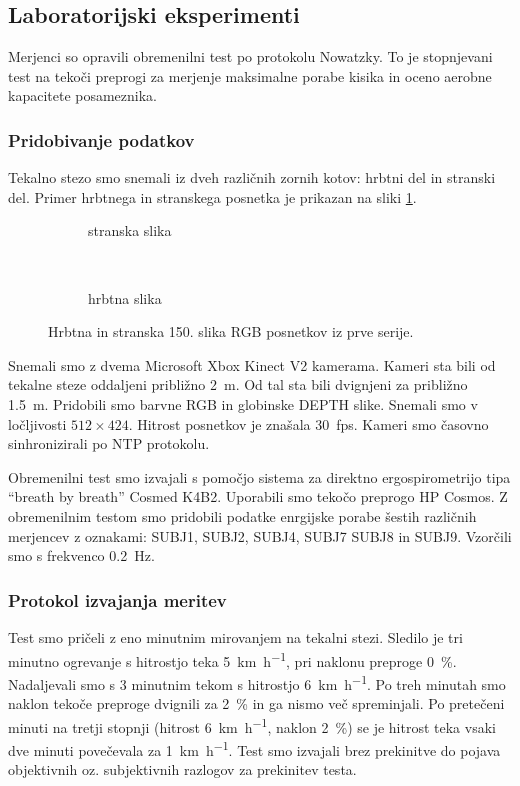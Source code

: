 \subsection{Laboratorijski eksperimenti}
Merjenci so opravili obremenilni test po protokolu Nowatzky. To je stopnjevani test na tekoči preprogi za merjenje maksimalne porabe kisika in oceno aerobne kapacitete posameznika.

\subsubsection{Pridobivanje podatkov}
Tekalno stezo smo snemali iz dveh različnih zornih kotov: hrbtni del in stranski del.  Primer hrbtnega in stranskega posnetka je prikazan na sliki \ref{fig:primer-posnetka-stage2}.

\begin{figure}[htb]
	\centering
	\begin{subfigure}{0.45\columnwidth}
		\caption{stranska slika}
	\end{subfigure}
	~
	\begin{subfigure}{0.45\columnwidth}
		\caption{hrbtna slika}
	\end{subfigure}
	\caption{Hrbtna in stranska 150. slika RGB posnetkov iz prve serije.}
	\label{fig:primer-posnetka-stage2}
\end{figure}

Snemali smo z dvema Microsoft Xbox Kinect V2 kamerama. Kameri sta bili od tekalne steze oddaljeni približno \SI{2}{m}. Od tal sta bili dvignjeni za približno \SI{1.5}{m}. Pridobili smo barvne RGB in globinske DEPTH slike. Snemali smo v ločljivosti $512 \times 424$. Hitrost posnetkov je znašala \SI{30}{fps}. Kameri smo časovno sinhronizirali po NTP protokolu.

Obremenilni test smo izvajali s pomočjo sistema za direktno ergospirometrijo tipa ``breath  by breath'' Cosmed K4B2. Uporabili smo  tekočo  preprogo HP Cosmos. Z obremenilnim testom smo pridobili podatke enrgijske porabe šestih različnih merjencev z oznakami: SUBJ1, SUBJ2, SUBJ4, SUBJ7 SUBJ8 in SUBJ9. Vzorčili smo s frekvenco \SI{0.2}{\hertz}.

\subsubsection{Protokol izvajanja meritev}
Test smo pričeli z eno minutnim mirovanjem na tekalni stezi. Sledilo je tri minutno ogrevanje s hitrostjo teka \SI{5}{\km\per\hour}, pri naklonu preproge \SI{0}{\%}. Nadaljevali smo s 3 minutnim tekom s hitrostjo \SI{6}{\km\per\hour}. Po treh minutah smo naklon tekoče preproge  dvignili za \SI{2}{\%} in ga nismo več spreminjali. Po pretečeni minuti na  tretji stopnji (hitrost \SI{6}{\km\per\hour}, naklon \SI{2}{\%}) se je hitrost teka vsaki dve  minuti  povečevala za \SI{1}{\km\per\hour}. Test smo izvajali brez prekinitve do pojava objektivnih oz. subjektivnih razlogov za prekinitev testa. 
 

